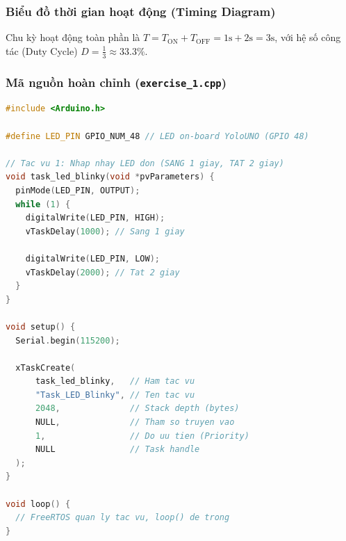 \vspace{0.2cm}
\subsubsection{Biểu đồ thời gian hoạt động (Timing Diagram)}
Chu kỳ hoạt động toàn phần là $T = T_{\text{ON}} + T_{\text{OFF}} = 1\text{s} + 2\text{s} = 3\text{s}$, với hệ số công tác (Duty Cycle) $D = \frac{1}{3} \approx 33.3\%$.

\begin{center}
\end{center}

\subsubsection{Mã nguồn hoàn chỉnh (\texttt{exercise\_1.cpp})}
\begin{lstlisting}[language=C++]
#include <Arduino.h>

#define LED_PIN GPIO_NUM_48 // LED on-board YoloUNO (GPIO 48)

// Tac vu 1: Nhap nhay LED don (SANG 1 giay, TAT 2 giay)
void task_led_blinky(void *pvParameters) {
  pinMode(LED_PIN, OUTPUT);
  while (1) {
    digitalWrite(LED_PIN, HIGH);
    vTaskDelay(1000); // Sang 1 giay

    digitalWrite(LED_PIN, LOW);
    vTaskDelay(2000); // Tat 2 giay
  }
}

void setup() {
  Serial.begin(115200);

  xTaskCreate(
      task_led_blinky,   // Ham tac vu
      "Task_LED_Blinky", // Ten tac vu
      2048,              // Stack depth (bytes)
      NULL,              // Tham so truyen vao
      1,                 // Do uu tien (Priority)
      NULL               // Task handle
  );
}

void loop() {
  // FreeRTOS quan ly tac vu, loop() de trong
}
\end{lstlisting}

